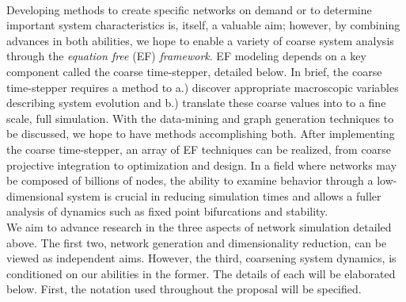 \documentclass[11pt]{article}
\begin{document}
\vspace{1mm}\\
Developing methods to create specific networks on demand or to determine important system characteristics is, itself, a valuable aim; however, by combining advances in both abilities, we hope to enable a variety of coarse system analysis through the \textit{equation free} (EF) \textit{framework}. EF modeling depends on a key component called the coarse time-stepper, detailed below. In brief, the coarse time-stepper requires a method to a.) discover appropriate macroscopic variables describing system evolution and b.) translate these coarse values into to a fine scale, full simulation. With the data-mining and graph generation techniques to be discussed, we hope to have methods accomplishing both. After implementing the coarse time-stepper, an array of EF techniques can be realized, from coarse projective integration to optimization and design. In a field where networks may be composed of billions of nodes, the ability to examine behavior through a low-dimensional system is crucial in reducing simulation times and allows a fuller analysis of dynamics such as fixed point bifurcations and stability.\vspace{1mm}\\
We aim to advance research in the three aspects of network simulation detailed above. The first two, network generation and dimensionality reduction, can be viewed as independent aims. However, the third, coarsening system dynamics, is conditioned on our abilities in the former. The details of each will be elaborated below. First, the notation used throughout the proposal will be specified.
\end{document}
